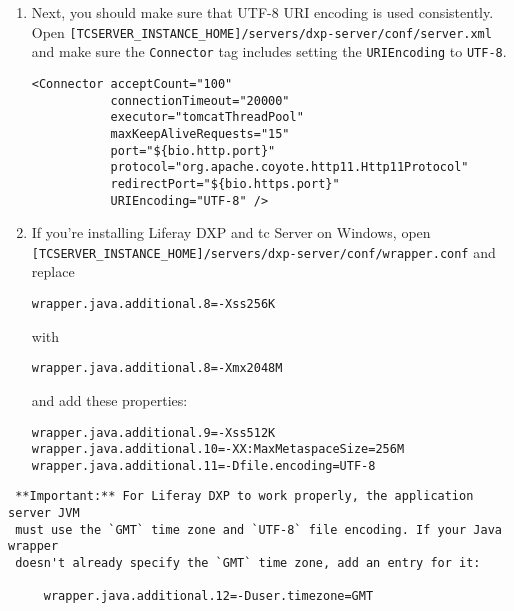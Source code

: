 \begin{enumerate}
\def\labelenumi{\arabic{enumi}.}
\setcounter{enumi}{1}
\item
  Next, you should make sure that UTF-8 URI encoding is used
  consistently. Open
  \texttt{{[}TCSERVER\_INSTANCE\_HOME{]}/servers/dxp-server/conf/server.xml}
  and make sure the \texttt{Connector} tag includes setting the
  \texttt{URIEncoding} to \texttt{UTF-8}.

\begin{verbatim}
<Connector acceptCount="100"
           connectionTimeout="20000"
           executor="tomcatThreadPool"
           maxKeepAliveRequests="15"
           port="${bio.http.port}"
           protocol="org.apache.coyote.http11.Http11Protocol"
           redirectPort="${bio.https.port}"
           URIEncoding="UTF-8" />
\end{verbatim}
\item
  If you're installing Liferay DXP and tc Server on Windows, open
  \texttt{{[}TCSERVER\_INSTANCE\_HOME{]}/servers/dxp-server/conf/wrapper.conf}
  and replace

\begin{verbatim}
wrapper.java.additional.8=-Xss256K
\end{verbatim}

  with

\begin{verbatim}
wrapper.java.additional.8=-Xmx2048M
\end{verbatim}

  and add these properties:

\begin{verbatim}
wrapper.java.additional.9=-Xss512K
wrapper.java.additional.10=-XX:MaxMetaspaceSize=256M
wrapper.java.additional.11=-Dfile.encoding=UTF-8
\end{verbatim}
\end{enumerate}

\noindent\hrulefill

\begin{verbatim}
 **Important:** For Liferay DXP to work properly, the application server JVM
 must use the `GMT` time zone and `UTF-8` file encoding. If your Java wrapper
 doesn't already specify the `GMT` time zone, add an entry for it:
 
     wrapper.java.additional.12=-Duser.timezone=GMT
\end{verbatim}

\noindent\hrulefill

\noindent\hrulefill

